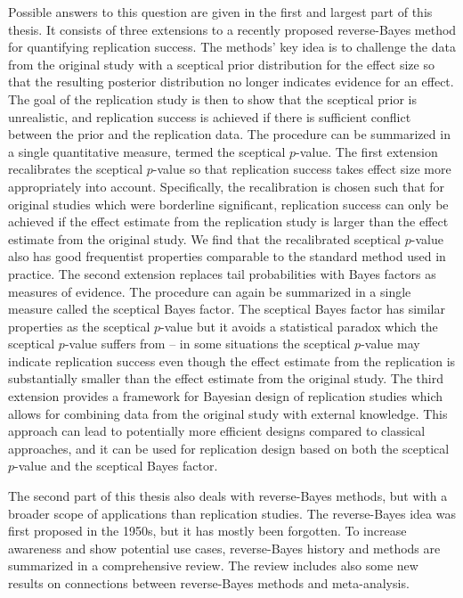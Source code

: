 Possible answers to this question are given in the first and largest part of
this thesis. It consists of three extensions to a recently proposed
reverse-Bayes method for quantifying replication success. The methods' key idea
is to challenge the data from the original study with a sceptical prior
distribution for the effect size so that the resulting posterior distribution no
longer indicates evidence for an effect. The goal of the replication study is
then to show that the sceptical prior is unrealistic, and replication success is
achieved if there is sufficient conflict between the prior and the replication
data. The procedure can be summarized in a single quantitative measure, termed
the sceptical $p$-value.
The first extension recalibrates the sceptical $p$-value so that replication
success takes effect size more appropriately into account. Specifically, the
recalibration is chosen such that for original studies which were borderline
significant, replication success can only be achieved if the effect estimate
from the replication study is larger than the effect estimate from the original
study. We find that the recalibrated sceptical $p$-value also has good
frequentist properties comparable to the standard method used in practice.
The second extension replaces tail probabilities with Bayes factors as measures
of evidence. The procedure can again be summarized in a single measure called
the sceptical Bayes factor. The sceptical Bayes factor has similar properties as
the sceptical $p$-value but it avoids a statistical paradox which the sceptical
$p$-value suffers from -- in some situations the sceptical $p$-value may
indicate replication success even though the effect estimate from the
replication is substantially smaller than the effect estimate from the original
study.
The third extension provides a framework for Bayesian design of replication
studies which allows for combining data from the original study with external
knowledge. This approach can lead to potentially more efficient designs compared
to classical approaches, and it can be used for replication design based on both
the sceptical $p$-value and the sceptical Bayes factor.

The second part of this thesis also deals with reverse-Bayes methods, but with a
broader scope of applications than replication studies. The reverse-Bayes idea
was first proposed in the 1950s, but it has mostly been forgotten. To increase
awareness and show potential use cases, reverse-Bayes history and methods are
summarized in a comprehensive review. The review includes also some new results
on connections between reverse-Bayes methods and meta-analysis. %

